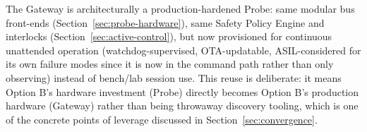 The Gateway is architecturally a production-hardened Probe: same modular bus front-ends (Section~\ref{sec:probe-hardware}), same Safety Policy Engine and interlocks (Section~\ref{sec:active-control}), but now provisioned for continuous unattended operation (watchdog-supervised, OTA-updatable, ASIL-considered for its own failure modes since it is now in the command path rather than only observing) instead of bench/lab session use. This reuse is deliberate: it means Option B's hardware investment (Probe) directly becomes Option B's production hardware (Gateway) rather than being throwaway discovery tooling, which is one of the concrete points of leverage discussed in Section~\ref{sec:convergence}.
